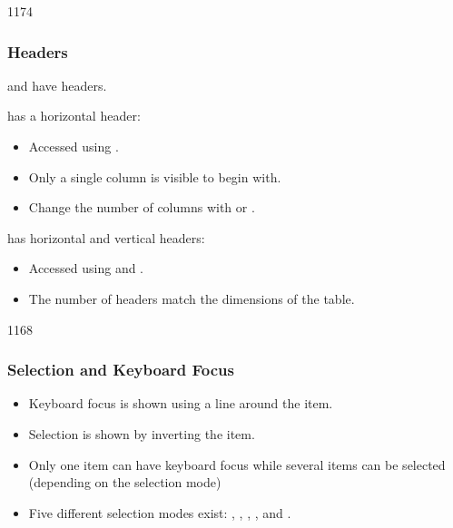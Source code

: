 \begin{slide}{1174}\frametitle{Headers}

 and  have headers.

\vspace*{1em}
 has a horizontal header:
\begin{itemize}
\item Accessed using .
\item Only a single column is visible to begin with.
\item Change the number of columns with  or
.
\end{itemize}

\vspace*{0.5em}
 has horizontal and vertical headers:
\begin{itemize}
\item Accessed using 
and .
\item The number of headers match the dimensions of the table.
\end{itemize}
\end{slide}


\begin{slide}{1168}\frametitle{Selection and Keyboard Focus}
\begin{itemize}
\item Keyboard focus is shown using a line around the item.
\item Selection is shown by inverting the item.
\item Only one item can have keyboard focus while several items can be
  selected (depending on the selection mode)
\item Five different selection modes exist: ,
  , ,
  , and .
\end{itemize}
\end{slide}

